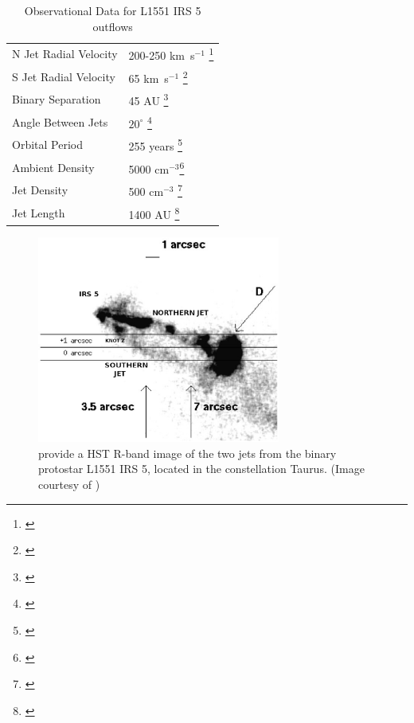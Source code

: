 \documentclass{aa}
\begin{document}
 
\begin{table}[tb]
\caption{Observational Data for L1551 IRS 5 outflows}
\centering
\begin{minipage}{0.5\textwidth}
\begin{tabular}{l l}
\hline
\hline
N Jet Radial Velocity & 200-250 km~s$^{-1}$ \footnote{ \citet{2000AJ....119.1872H}} \\
S Jet Radial Velocity & 65 km~s$^{-1}$  \footnote{  \citet{2000AJ....119.1872H} }\\
Binary Separation & 45 AU \footnote{\citet{2005ApJ...L} } \\
Angle Between Jets & $20^{\circ}$  \footnote{\citet{1998ApJ...499L..75F}} \\
Orbital Period & 255 years \footnote{\citet{2000PASJ...52...81I}}\\
Ambient Density & 5000 cm$^{-3}$\footnote{\citet{1998ApJ...499L..75F}} \\
Jet Density & 500 cm$^{-3}$ \footnote{\citet{1998ApJ...499L..75F}} \\
Jet Length & 1400 AU \footnote{\citet{1998ApJ...499L..75F}}\\
\hline
\end{tabular}
\end{minipage}
\end{table}



\begin{figure}[ht]
\centering
\includegraphics[width=8cm]{8609fig1.eps}
\caption{
\citet{1998ApJ...499L..75F} provide a HST R-band image of the two jets from the
binary protostar L1551 IRS 5, located in the constellation Taurus. (Image courtesy of \citet{1998ApJ...499L..75F}) 
}
\label{fig:4-1} 
\end{figure}


\end{document}
